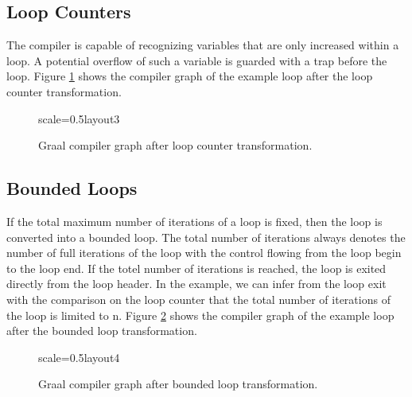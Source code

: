 \documentclass[twocolumn]{svjour3}
\begin{document}
\subsection{Loop Counters}
The compiler is capable of recognizing variables that are only increased within a loop.
A potential overflow of such a variable is guarded with a trap before the loop.
Figure \ref{fig:loop3} shows the compiler graph of the example loop after the loop counter transformation.


\begin{figure}[h]
  \label{fig:loop3}
  \centering
\begin{digraphenv}{scale=0.5}{layout3}
\end{digraphenv}
  \caption{Graal compiler graph after loop counter transformation.}
\end{figure}

\subsection{Bounded Loops}

If the total maximum number of iterations of a loop is fixed, then the loop is converted into a bounded loop.
The total number of iterations always denotes the number of full iterations of the loop with the control flowing from the loop begin to the loop end.
If the totel number of iterations is reached, the loop is exited directly from the loop header.
In the example, we can infer from the loop exit with the comparison on the loop counter that the total number of iterations of the loop is limited to n.
Figure \ref{fig:loop4} shows the compiler graph of the example loop after the bounded loop transformation.

\begin{figure}[h]
  \label{fig:loop4}
  \centering
\begin{digraphenv}{scale=0.5}{layout4}
\end{digraphenv}
  \caption{Graal compiler graph after bounded loop transformation.}
\end{figure}
\end{document}
